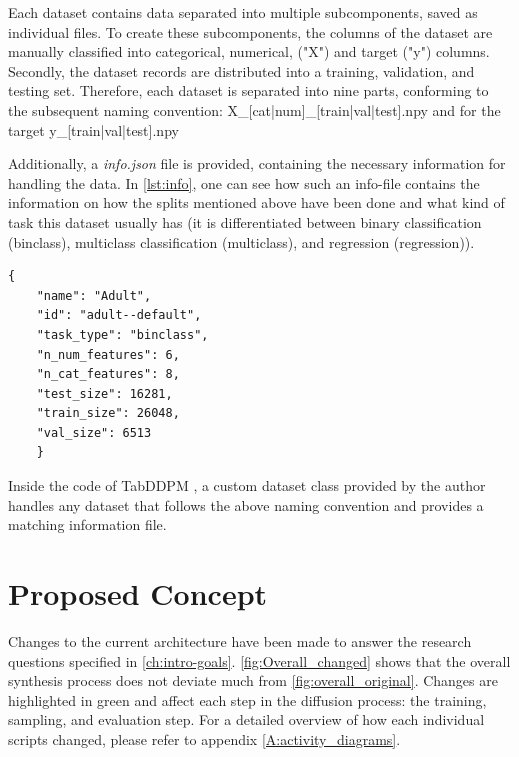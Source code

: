Each dataset contains data separated into multiple subcomponents, saved as individual files.
To create these subcomponents, the columns of the dataset are manually classified into categorical, numerical, ("X") and target ("y") columns.
Secondly, the dataset records are distributed into a training, validation, and testing set.
Therefore, each dataset is separated into nine parts, conforming to the subsequent naming convention:
X\_[cat|num]\_[train|val|test].npy and for the target y\_[train|val|test].npy

Additionally, a \textit{info.json} file is provided, containing the necessary information for handling the data.
In \autoref{lst:info}, one can see how such an info-file contains the information on how the splits mentioned above have been done and what kind of task this dataset usually has (it is differentiated between binary classification (binclass), multiclass classification (multiclass), and regression (regression)).
\begin{lstlisting}[label={lst:info},caption={Example Data-info File}]
    {
    "name": "Adult",
    "id": "adult--default",
    "task_type": "binclass",
    "n_num_features": 6,
    "n_cat_features": 8,
    "test_size": 16281,
    "train_size": 26048,
    "val_size": 6513
    }
\end{lstlisting}
Inside the code of TabDDPM \cite{akim2023TabDDPMModellingTabular}, a custom dataset class provided by the author handles any dataset that follows the above naming convention and provides a matching information file.

\section{Proposed Concept}
\label{ch:conceptualDesign-changes}

Changes to the current architecture have been made to answer the research questions specified in \autoref{ch:intro-goals}.
\autoref{fig:Overall_changed} shows that the overall synthesis process does not deviate much from \autoref{fig:overall_original}.
Changes are highlighted in green and affect each step in the diffusion process: the training, sampling, and evaluation step.
For a detailed overview of how each individual scripts changed, please refer to appendix \ref{A:activity_diagrams}.

